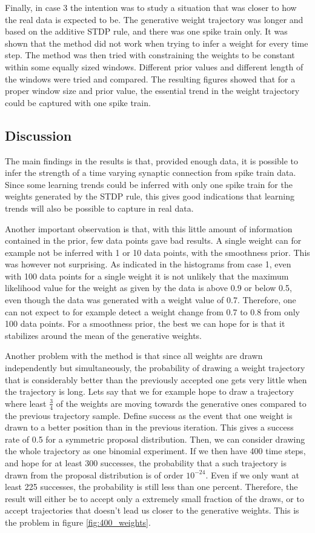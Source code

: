 Finally, in case 3 the intention was to study a situation that was closer to how the real data is expected to be. The generative weight trajectory was longer and based on the additive STDP rule, and there was one spike train only. It was shown that the method did not work when trying to infer a weight for every time step. The method was then tried with constraining the weights to be constant within some equally sized windows. Different prior values and different length of the windows were tried and compared. The resulting figures showed that for a proper window size and prior value, the essential trend in the weight trajectory could be captured with one spike train.

\subsection{Discussion} 

The main findings in the results is that, provided enough data, it is possible to infer the strength of a time varying synaptic connection from spike train data. Since some learning trends could be inferred with only one spike train for the weights generated by the STDP rule, this gives good indications that learning trends will also be possible to capture in real data. 

Another important observation is that, with this little amount of information contained in the prior, few data points gave bad results. A single weight can for example not be inferred with 1 or 10 data points, with the smoothness prior. This was however not surprising. As indicated in the histograms from case 1, even with 100 data points for a single weight it is not unlikely that the maximum likelihood value for the weight as given by the data is above 0.9 or below 0.5, even though the data was generated with a weight value of 0.7. Therefore, one can not expect to for example detect a weight change from 0.7 to 0.8 from only 100 data points. For a smoothness prior, the best we can hope for is that it stabilizes around the mean of the generative weights.

Another problem with the method is that since all weights are drawn independently but simultaneously, the probability of drawing a weight trajectory that is considerably better than the previously accepted one gets very little when the trajectory is long. Lets say that we for example hope to draw a trajectory where least $\frac{3}{4}$ of the weights are moving towards the generative ones compared to the previous trajectory sample. Define success as the event that one weight is drawn to a better position than in the previous iteration. This gives a success rate of 0.5 for a symmetric proposal distribution. Then, we can consider drawing the whole trajectory as one binomial experiment. If we then have 400 time steps, and hope for at least 300 successes, the probability that a such trajectory is drawn from the proposal distribution is of order $10^{-24}$. Even if we only want at least 225 successes, the probability is still less than one percent. Therefore, the result will either be to accept only a extremely small fraction of the draws, or to accept trajectories that doesn't lead us closer to the generative weights. This is the problem in figure \ref{fig:400_weights}.

